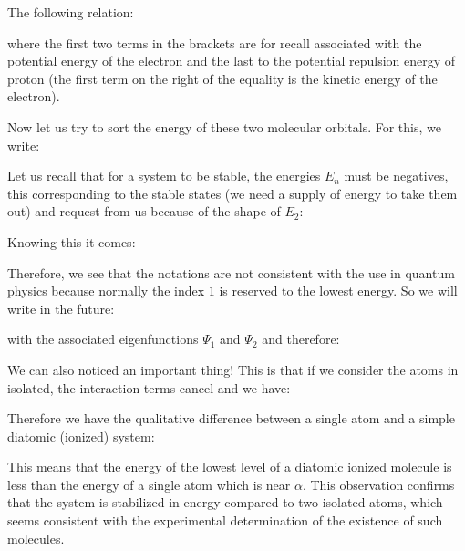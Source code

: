 	The following relation:
	
	where the first two terms in the brackets are for recall associated with the potential energy of the electron and the last to the potential repulsion energy of proton (the first term on the right of the equality is the kinetic energy of the electron).

	Now let us try to sort the energy of these two molecular orbitals. For this, we write:
	
	Let us recall that for a system to be stable, the energies  $E_n$ must be negatives, this corresponding to the stable states (we need a supply of energy to take them out) and request from us because of the shape of $E_2$:
	
	Knowing this it comes:
	
	Therefore, we see that the notations are not consistent with the use in quantum physics because normally the index $1$ is reserved to the lowest energy. So we will write in the future:
	
	with the associated eigenfunctions  $\Psi_1$ and $\Psi_2$ and therefore:
	
	We can also noticed an important thing! This is that if we consider the atoms in isolated, the interaction terms cancel and we have:
	
	Therefore we have the qualitative difference between a single atom and a simple diatomic (ionized) system:
	
	This means that the energy of the lowest level of a diatomic ionized molecule is less than the energy of a single atom which is near $\alpha$. This observation confirms that the system is stabilized in energy compared to two isolated atoms, which seems consistent with the experimental determination of the existence of such molecules.
	
